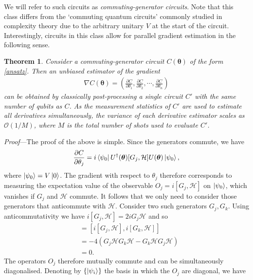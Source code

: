 \documentclass[twocolumn]{revtex4-2}
\newtheorem{theorem}{Theorem}
\renewcommand{\vec}{\boldsymbol}
\begin{document}
We will refer to such circuits as \emph{commuting-generator circuits}. Note that this class differs from the `commuting quantum circuits' \cite{bremner2016average,ni2012commuting} commonly studied in complexity theory due to the arbitrary unitary $V$ at the start of the circuit. Interestingly, circuits in this class allow for parallel gradient estimation in the following sense. 
%
\begin{theorem}\label{thm:grad}
Consider a commuting-generator circuit $C(\vec{\theta})$ of the form \eqref{ansatz}. %
Then an unbiased estimator of the gradient
\begin{align}
    \nabla C(\vec{\theta})=\left(\frac{\partial C}{\partial \theta_1},\frac{\partial C}{\partial \theta_2},\cdots,\frac{\partial C}{\partial \theta_n}\right)
\end{align}
can be obtained by classically post-processing a single circuit $C'$ with the same number of qubits as $C$.
As the measurement statistics of $C'$ are used to estimate all derivatives simultaneously, the variance of each derivative estimator scales as $\mathcal{O}(1/M)$, where $M$ is the total number of shots used to evaluate $C'$.
\end{theorem}
%
\emph{Proof}---The proof of the above is simple. Since the generators commute, we have 
%
\begin{align}\label{thegrad}
    \frac{\partial C}{\partial \theta_j}= i \bra{\psi_0} U^{\dagger}(\vec{\theta})[G_j,\mathcal{H}]U(\vec{\theta})\ket{\psi_0},
\end{align}
%
where $\ket{\psi_0}=V\ket{0}$. The gradient with respect to $\theta_j$ therefore corresponds to measuring the expectation value of the observable $O_j=i[G_j,\mathcal{H}]$ on $\ket{\psi_0}$, which vanishes if $G_j$ and $\mathcal{H}$ commute. It follows that we only need to consider those generators that anticommute with $\mathcal{H}$. Consider two such generators $G_j, G_k$. Using anticommutativity we have $i[G_j,\mathcal{H}] = 2iG_j\mathcal{H}$ and so
%
\begin{align}
    [O_j,O_k] &= [i[G_j,\mathcal{H}],i[G_k,\mathcal{H}]] \nonumber\\
    &=-4(G_j\mathcal{H}G_k\mathcal{H}-G_k\mathcal{H}G_j\mathcal{H}) \nonumber \\
    &=0.
\end{align}
%
The operators $O_j$ therefore mutually commute and can be simultaneously diagonalised. Denoting by $\{\ket{\psi_i}\}$ the basis in which the $O_j$ are diagonal, we have
\end{document}
